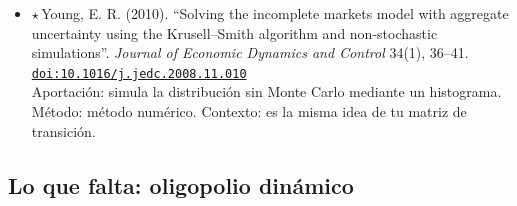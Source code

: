 \documentclass[11pt]{article}
\begin{document}
\begin{itemize}
Aportación: modelo de crecimiento con ahorro precautorio y restricciones de liquidez. Método: análisis cualitativo y cuantitativo. Contexto: referente clásico de la distribución estacionaria de agentes.
\item $\star$\,Young, E. R. (2010). ``Solving the incomplete markets model with aggregate uncertainty using the Krusell–Smith algorithm and non-stochastic simulations''. \textit{Journal of Economic Dynamics and Control} 34(1), 36--41. \href{https://doi.org/10.1016/j.jedc.2008.11.010}{\texttt{doi:10.1016/j.jedc.2008.11.010}}\\
Aportación: simula la distribución sin Monte Carlo mediante un histograma. Método: método numérico. Contexto: es la misma idea de tu matriz de transición.
\end{itemize}

\subsection*{Lo que falta: oligopolio dinámico}
\end{document}
